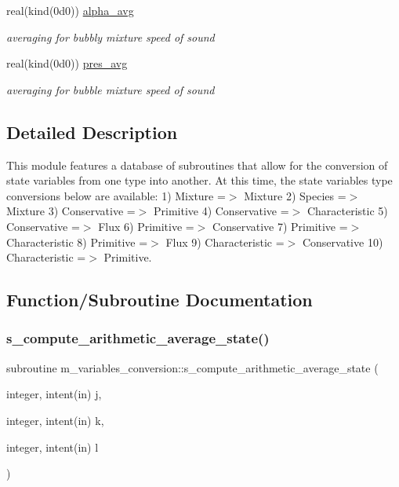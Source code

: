 \begin{Indent}
\begin{DoxyCompactItemize}
real(kind(0d0)) \hyperlink{namespacem__variables__conversion_ac41b66d567256cb60746f95010a6ea65}{alpha\+\_\+avg}
\begin{DoxyCompactList}\small\item\em averaging for bubbly mixture speed of sound \end{DoxyCompactList}\item 
real(kind(0d0)) \hyperlink{namespacem__variables__conversion_a45f7e4963c2a7c792bad6a90bbe43c36}{pres\+\_\+avg}
\begin{DoxyCompactList}\small\item\em averaging for bubble mixture speed of sound \end{DoxyCompactList}\end{DoxyCompactItemize}
\end{Indent}


\subsection{Detailed Description}
This module features a database of subroutines that allow for the conversion of state variables from one type into another. At this time, the state variables type conversions below are available\+: 1) Mixture =$>$ Mixture 2) Species =$>$ Mixture 3) Conservative =$>$ Primitive 4) Conservative =$>$ Characteristic 5) Conservative =$>$ Flux 6) Primitive =$>$ Conservative 7) Primitive =$>$ Characteristic 8) Primitive =$>$ Flux 9) Characteristic =$>$ Conservative 10) Characteristic =$>$ Primitive. 

\subsection{Function/\+Subroutine Documentation}
\mbox{\label{namespacem__variables__conversion_a825db8aee0af3c120a7ca1f8de814490}} 
\subsubsection{\texorpdfstring{s\+\_\+compute\+\_\+arithmetic\+\_\+average\+\_\+state()}{s\_compute\_arithmetic\_average\_state()}}
{\footnotesize\ttfamily subroutine m\+\_\+variables\+\_\+conversion\+::s\+\_\+compute\+\_\+arithmetic\+\_\+average\+\_\+state (\begin{DoxyParamCaption}\item[{integer, intent(in)}]{j,  }\item[{integer, intent(in)}]{k,  }\item[{integer, intent(in)}]{l }\end{DoxyParamCaption})}



